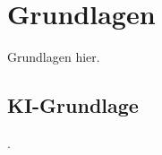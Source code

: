 
\section{Grundlagen}
\label{sec:ki:grundlagen}

Grundlagen hier.

\subsection{KI-Grundlage}
\label{sec:ki_grundlage}

.
